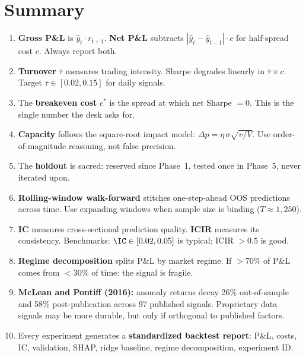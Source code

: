 \section{Summary}
\label{sec:ch12-summary}

\begin{enumerate}[nosep]
  \item \textbf{Gross P\&L} is $\hat{y}_t \cdot r_{t+1}$.  \textbf{Net P\&L} subtracts $|\hat{y}_t - \hat{y}_{t-1}| \cdot c$ for half-spread cost $c$.  Always report both.
  \item \textbf{Turnover} $\bar{\tau}$ measures trading intensity.  Sharpe degrades linearly in $\bar{\tau} \times c$.  Target $\bar{\tau} \in [0.02, 0.15]$ for daily signals.
  \item The \textbf{breakeven cost} $c^*$ is the spread at which net Sharpe $= 0$.  This is the single number the desk asks for.
  \item \textbf{Capacity} follows the square-root impact model: $\Delta p = \eta\,\sigma\sqrt{v/V}$.  Use order-of-magnitude reasoning, not false precision.
  \item The \textbf{holdout} is sacred: reserved since Phase~1, tested once in Phase~5, never iterated upon.
  \item \textbf{Rolling-window walk-forward} stitches one-step-ahead OOS predictions across time.  Use expanding windows when sample size is binding ($T \approx 1{,}250$).
  \item \textbf{IC} measures cross-sectional prediction quality.  \textbf{ICIR} measures its consistency.  Benchmarks: $\IC \in [0.02, 0.05]$ is typical; ICIR $> 0.5$ is good.
  \item \textbf{Regime decomposition} splits P\&L by market regime.  If $>70\%$ of P\&L comes from $<30\%$ of time: the signal is fragile.
  \item \textbf{McLean and Pontiff (2016):} anomaly returns decay 26\% out-of-sample and 58\% post-publication across 97 published signals.  Proprietary data signals may be more durable, but only if orthogonal to published factors.
  \item Every experiment generates a \textbf{standardized backtest report}: P\&L, costs, IC, validation, SHAP, ridge baseline, regime decomposition, experiment ID.
\end{enumerate}

